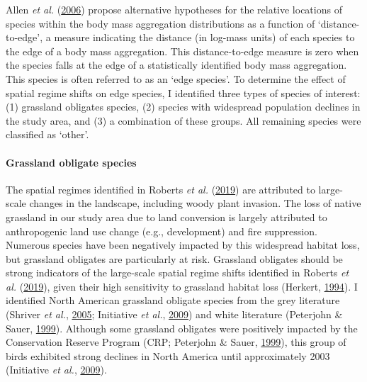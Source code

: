 \documentclass[12pt,twoside,openany]{reedthesis}
\begin{document}
Allen \emph{et al.} (\protect\hyperlink{ref-allen2006patterns}{2006}) propose alternative hypotheses for the relative locations of species within the body mass aggregation distributions as a function of `distance-to-edge', a measure indicating the distance (in log-mass units) of each species to the edge of a body mass aggregation. This distance-to-edge measure is zero when the species falls at the edge of a statistically identified body mass aggregation. This species is often referred to as an `edge species'. To determine the effect of spatial regime shifts on edge species, I identified three types of species of interest: (1) grassland obligates species, (2) species with widespread population declines in the study area, and (3) a combination of these groups. All remaining species were classified as `other'.

\hypertarget{grassland-obligate-species}{%
\paragraph{Grassland obligate species}\label{grassland-obligate-species}}

The spatial regimes identified in Roberts \emph{et al.} (\protect\hyperlink{ref-roberts2019shifting}{2019}) are attributed to large-scale changes in the landscape, including woody plant invasion. The loss of native grassland in our study area due to land conversion is largely attributed to anthropogenic land use change (e.g., development) and fire suppression. Numerous species have been negatively impacted by this widespread habitat loss, but grassland obligates are particularly at risk. Grassland obligates should be strong indicators of the large-scale spatial regime shifts identified in Roberts \emph{et al.} (\protect\hyperlink{ref-roberts2019shifting}{2019}), given their high sensitivity to grassland habitat loss (Herkert, \protect\hyperlink{ref-herkert1994effects}{1994}). I identified North American grassland obligate species from the grey literature (Shriver \emph{et al.}, \protect\hyperlink{ref-shriver2005distribution}{2005}; Initiative \emph{et al.}, \protect\hyperlink{ref-north2009state}{2009}) and white literature (Peterjohn \& Sauer, \protect\hyperlink{ref-peterjohn1999population}{1999}). Although some grassland obligates were positively impacted by the Conservation Reserve Program (CRP; Peterjohn \& Sauer, \protect\hyperlink{ref-peterjohn1999population}{1999}), this group of birds exhibited strong declines in North America until approximately 2003 (Initiative \emph{et al.}, \protect\hyperlink{ref-north2009state}{2009}).
\end{document}
